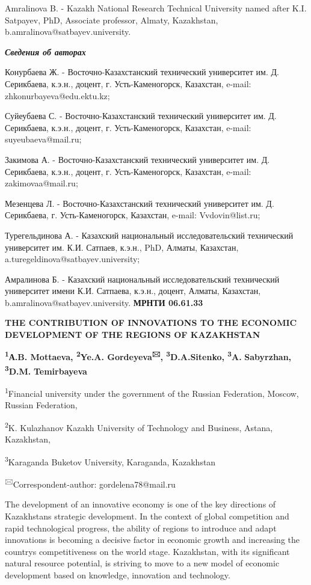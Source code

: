Amralinova B. - Kazakh National Research Technical University named
after K.I. Satpayev, PhD, Associate professor, Almaty, Kazakhstan,
b.amralinova@satbayev.university.

\emph{{\bfseries Сведения об авторах}}

Конурбаева Ж. - Восточно-Казахстанский технический университет им. Д.
Серикбаева, к.э.н., доцент, г. Усть-Каменогорск, Казахстан, e-mail:
zhkonurbayeva@edu.ektu.kz;

Суйеубаева С. - Восточно-Казахстанский технический университет им. Д.
Серикбаева, к.э.н., доцент, г. Усть-Каменогорск, Казахстан, e-mail:
suyeubaeva@mail.ru;

Закимова А. - Восточно-Казахстанский технический университет им. Д.
Серикбаева, к.э.н., доцент, г. Усть-Каменогорск, Казахстан, e-mail:
zakimovaa@mail.ru;

Мезенцева Л. - Восточно-Казахстанский технический университет им. Д.
Серикбаева, г. Усть-Каменогорск, Казахстан, e-mail: Vvdovin@list.ru;

Турегельдинова А. - Казахский национальный исследовательский технический
университет им. К.И. Сатпаев, к.э.н., PhD, Алматы, Казахстан,
a.turegeldinova@satbayev.university;

Амралинова Б. - Казахский национальный исследовательский технический
университет имени К.И. Сатпаева, к.э.н., доцент, Алматы, Казахстан,
b.amralinova@satbayev.university.\newpage
{\bfseries МРНТИ 06.61.33}

{\bfseries THE CONTRIBUTION OF INNOVATIONS TO THE ECONOMIC DEVELOPMENT OF
THE REGIONS OF KAZAKHSTAN}

{\bfseries \textsuperscript{1}А.B. Mottaeva, \textsuperscript{2}Ye.A.
Gordeyeva\textsuperscript{🖂}, \textsuperscript{3}D.A.Sitenko,
\textsuperscript{3}A.} {\bfseries Sabyrzhan, \textsuperscript{3}D.M.}
{\bfseries Temirbayeva}

\textsuperscript{1}Financial university under the government of the
Russian Federation, Moscow, Russian Federation,

\textsuperscript{2}K. Kulazhanov Kazakh University of Technology and
Business, Astana, Kazakhstan,

\textsuperscript{3}Karaganda Buketov University, Karaganda, Kazakhstan

\textsuperscript{🖂}Correspondent-author: gordelena78@mail.ru

The development of an innovative economy is one of the key directions of
Kazakhstan\textquotesingle s strategic development. In the context of
global competition and rapid technological progress, the ability of
regions to introduce and adapt innovations is becoming a decisive factor
in economic growth and increasing the country\textquotesingle s
competitiveness on the world stage. Kazakhstan, with its significant
natural resource potential, is striving to move to a new model of
economic development based on knowledge, innovation and technology.


